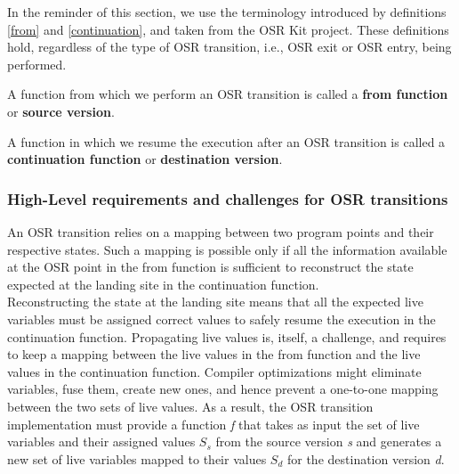 In the reminder of this section, we use the terminology introduced by definitions \ref{from} and \ref{continuation}, and taken from the OSR Kit\cite{OSRKit} project.
These definitions hold, regardless of the type of OSR transition, i.e., OSR exit or OSR entry, being performed.\\

\begin{definition}\label{from}
A function from which we perform an OSR transition is called a \textbf{from function} or \textbf{source version}.
\end{definition}

\begin{definition}\label{continuation}
A function in which we resume the execution after an OSR transition is called a \textbf{continuation function} or \textbf{destination version}.
\end{definition}

\subsubsection{High-Level requirements and challenges for OSR transitions}\label{HLREQ}

An OSR transition relies on a mapping between two program points and their respective states.
Such a mapping is possible only if all the information available at the OSR point in the from function is sufficient to reconstruct the state expected at the landing site in the continuation function.\\

Reconstructing the state at the landing site means that all the expected live variables must be assigned  correct values to safely resume the execution in the continuation function.
Propagating live values is, itself, a challenge, and requires to keep a mapping between the live values in the from function and the live values in the continuation function.
Compiler optimizations might eliminate variables, fuse them, create new ones, and hence prevent a one-to-one mapping between the two sets of live values. 
As a result, the OSR transition implementation must provide a function \textit{f} that takes as input the set of live variables and their assigned values $S_s$ from the source version \textit{s} and generates a new set of live variables mapped to their values $S_d$ for the destination version \textit{d}.

